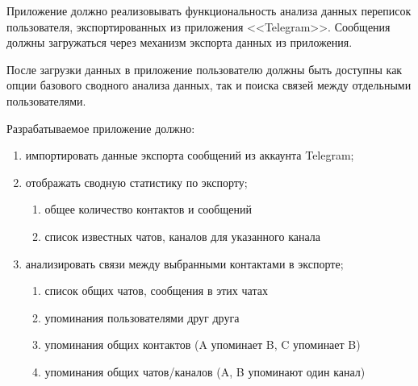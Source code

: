Приложение должно реализовывать функциональность анализа данных переписок пользователя, экспортированных из приложения <<Telegram>>. Сообщения должны загружаться через механизм экспорта данных из приложения.

После загрузки данных в приложение пользователю должны быть доступны как опции базового сводного анализа данных, так и поиска связей между отдельными пользователями.

Разрабатываемое приложение должно: 

\begin{enumerate}
    \item импортировать данные экспорта сообщений из аккаунта Telegram;
    \item отображать сводную статистику по экспорту;
    \begin{enumerate}
        \item общее количество контактов и сообщений
        \item список известных чатов, каналов для указанного канала
    \end{enumerate}
    \item анализировать связи между выбранными контактами в экспорте;
    \begin{enumerate}
        \item список общих чатов, сообщения в этих чатах
        \item упоминания пользователями друг друга
        \item упоминания общих контактов (A упоминает B, C упоминает B)
        \item упоминания общих чатов/каналов (A, B упоминают один канал)
    \end{enumerate}
\end{enumerate}
